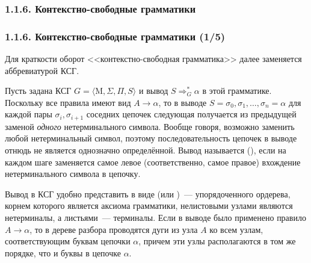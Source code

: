 \subsubsection{1.1.6. Контекстно-свободные грамматики}\label{1.1.6.}
\begin{frame}
\frametitle{1.1.6. Контекстно-свободные грамматики (1/5)}
\begin{remark}
Для краткости оборот <<контекстно-свободная грамматика>> далее заменяется аббревиатурой КСГ. 
\end{remark}
Пусть задана КСГ $G=\langle \mathrm{M}, \Sigma, \Pi, S\rangle$
и вывод $S\Rightarrow_G^*\alpha$
в этой грамматике. Поскольку все правила
имеют вид $A\rightarrow \alpha$, то в выводе
$S=\sigma_0,\sigma_1,\dots,\sigma_n=\alpha$
для каждой пары $\sigma_i,\sigma_{i+1}$
соседних цепочек
следующая получается из предыдущей заменой
{\em одного} нетерминального символа.
Вообще говоря, возможно заменить
любой нетерминальный символ,
поэтому последовательность цепочек в выводе 
отнюдь не является однозначно определённой.
Вывод называется
(),
если на каждом шаге заменяется самое левое
(соответственно, самое правое)
вхождение нетерминального символа в цепочку.

Вывод в КСГ
удобно представить в виде
(или )~---
упорядоченного ордерева,
корнем которого является аксиома грамматики,
нелистовыми узлами являются нетерминалы,
а листьями~--- терминалы. Если в выводе было применено
правило  $A\rightarrow \alpha$, то в дереве разбора проводятся
дуги из узла $A$ ко всем узлам, соответствующим буквам
цепочки $\alpha$, причем эти узлы располагаются
в том же порядке, что и буквы в цепочке $\alpha$.

\end{frame}


